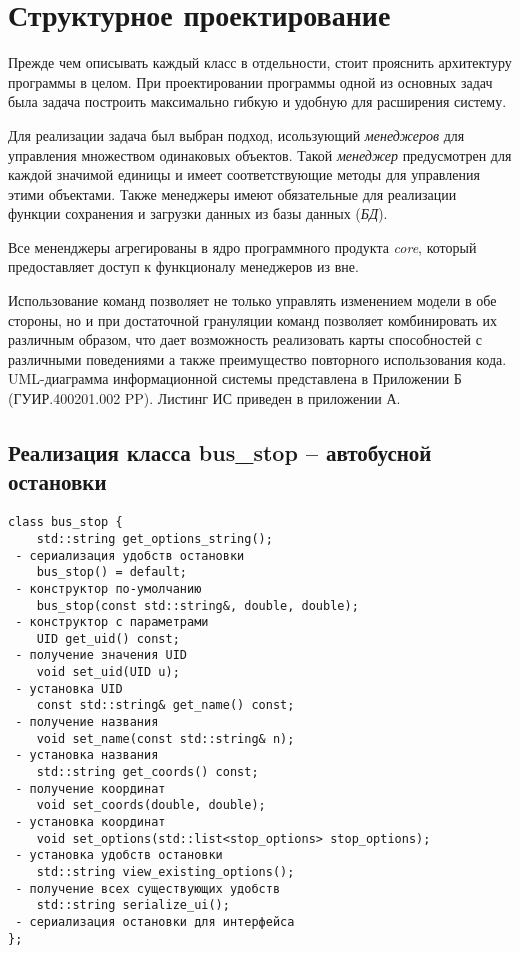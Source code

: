 \section{Структурное проектирование}

Прежде чем описывать каждый класс в отдельности, стоит прояснить архитектуру программы в целом. При проектировании программы одной из основных задач была задача построить максимально гибкую и удобную для расширения систему. 

Для реализации задача был выбран подход, исользующий \textit{менеджеров} для управления множеством одинаковых объектов\cite{paterns}. Такой \textit{менеджер} предусмотрен для каждой значимой единицы и имеет соответствующие методы для управления этими объектами. Также менеджеры имеют обязательные для реализации функции сохранения и загрузки данных из базы данных (\textit{БД}).

Все мененджеры агрегированы в ядро программного продукта \textit{core}, который предоставляет доступ к функционалу менеджеров из вне.

Использование команд позволяет не только управлять изменением модели в обе стороны, но и при достаточной грануляции команд позволяет комбинировать их различным образом, что дает возможность реализовать карты способностей с различными поведениями а также преимущество повторного использования кода\cite{skaliar}. UML-диаграмма информационной системы представлена в Приложении Б (ГУИР.400201.002 PP). Листинг ИС приведен в приложении А.

\subsection{Реализация класса bus\_stop -- автобусной остановки}
\begin{verbatim}
class bus_stop {
	std::string get_options_string(); 
 - сериализация удобств остановки
	bus_stop() = default;  
 - конструктор по-умолчанию
	bus_stop(const std::string&, double, double); 
 - конструктор с параметрами
	UID get_uid() const; 
 - получение значения UID
	void set_uid(UID u); 
 - установка UID
	const std::string& get_name() const; 
 - получение названия
	void set_name(const std::string& n); 
 - установка названия
	std::string get_coords() const; 
 - получение координат
	void set_coords(double, double); 
 - установка координат
	void set_options(std::list<stop_options> stop_options); 
 - установка удобств остановки
	std::string view_existing_options(); 
 - получение всех существующих удобств
	std::string serialize_ui(); 
 - сериализация остановки для интерфейса
};
\end{verbatim}

